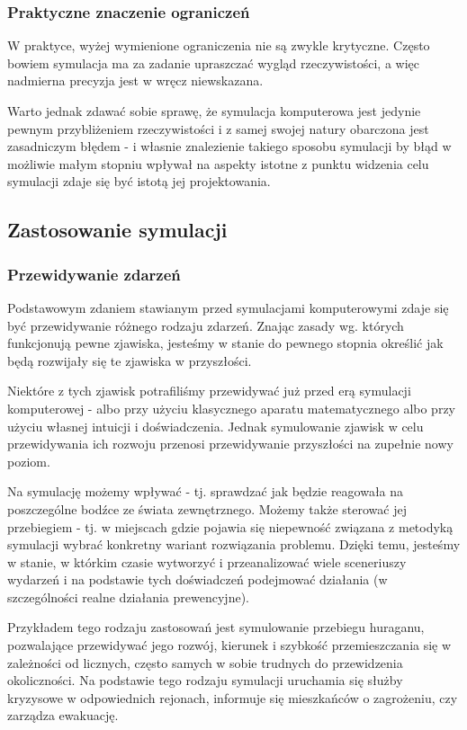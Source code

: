 \subsubsection{Praktyczne znaczenie ograniczeń}
\par{
W praktyce, wyżej wymienione ograniczenia nie są zwykle krytyczne. Często bowiem symulacja ma za zadanie upraszczać wygląd rzeczywistości, a więc nadmierna precyzja jest w wręcz niewskazana.
}
\par{
Warto jednak zdawać sobie sprawę, że symulacja komputerowa jest jedynie pewnym przybliżeniem rzeczywistości i z samej swojej natury obarczona jest zasadniczym błędem - i własnie znalezienie takiego sposobu symulacji by błąd w możliwie małym stopniu wpływał na aspekty istotne z punktu widzenia celu symulacji zdaje się być istotą jej projektowania.
}

\subsection{Zastosowanie symulacji}

\subsubsection{Przewidywanie zdarzeń}
\par{
Podstawowym zdaniem stawianym przed symulacjami komputerowymi zdaje się być przewidywanie różnego rodzaju zdarzeń. Znając zasady wg. których funkcjonują pewne zjawiska, jesteśmy w stanie do pewnego stopnia określić jak będą rozwijały się te zjawiska w przyszłości.
}
\par{
Niektóre z tych zjawisk potrafiliśmy przewidywać już przed erą symulacji komputerowej - albo przy użyciu klasycznego aparatu matematycznego albo przy użyciu własnej intuicji i doświadczenia. Jednak symulowanie zjawisk w celu przewidywania ich rozwoju przenosi przewidywanie przyszłości na zupełnie nowy poziom.
}
\par{
Na symulację możemy wpływać - tj. sprawdzać jak będzie reagowała na poszczególne bodźce ze świata zewnętrznego. Możemy także sterować jej przebiegiem - tj. w miejscach gdzie pojawia się niepewność związana z metodyką symulacji wybrać konkretny wariant rozwiązania problemu.
Dzięki temu, jesteśmy w stanie, w którkim czasie wytworzyć i przeanalizować wiele sceneriuszy wydarzeń i na podstawie tych doświadczeń podejmować działania (w szczególności realne działania prewencyjne).
}
\par{
Przykładem tego rodzaju zastosowań jest symulowanie przebiegu huraganu, pozwalające przewidywać jego rozwój, kierunek i szybkość przemieszczania się w zależności od licznych, często samych w sobie trudnych do przewidzenia okoliczności. Na podstawie tego rodzaju symulacji uruchamia się służby kryzysowe w odpowiednich rejonach, informuje się mieszkańców o zagrożeniu, czy zarządza ewakuację.
}

